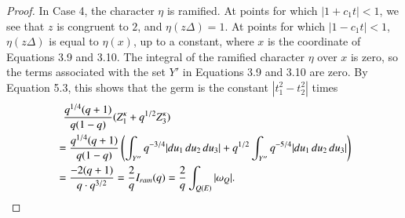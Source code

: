 \documentclass{amsart}
\begin{document}
\begin{proof}
In Case 4, the character $\eta$ is ramified.  
At points for
which $|1+c_1 t|<1$, we see that $z$ is congruent to $2$,
and $\eta(z\Delta) = 1$.  At points for which $|1-c_1 t|<1$,
$\eta(z\Delta)$ is equal to $\eta(x)$, up to a constant,
where $x$ is the coordinate of Equations 3.9 and 3.10.  
The integral of the ramified character $\eta$ over $x$
is zero, so the terms associated with the set $Y'$ in Equations
3.9 and 3.10 are zero.  By Equation 5.3,
this shows that the germ is the
constant $|t_1^2-t_2^2|$ times
\begin{align*}
&\phantom{ =} {q^{1/4}(q+1)\over q(1-q)}
       (Z_1^\kappa + q^{1/2} Z_3^\kappa)\\
&={q^{1/4}(q+1)\over q(1-q)} 
  \left(\int_{Y''} q^{-3/4}|du_1\,du_2\,du_3| +
        q^{1/2}\int_{Y''} q^{-5/4}|du_1\,du_2\,du_3|\right)\\
&= {-2 (q+1)\over q\cdot q^{3/2}} =
{2\over q} I_{ram}(q) = 
{2\over q} \int_{Q(E)} |\omega_Q|.
\end{align*}


\end{proof}
\end{document}
